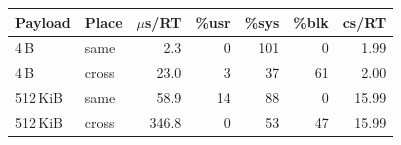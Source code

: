 \begin{tabular}{llrrrrr}
\toprule
Payload & Place & $\mu$s/RT & \%usr & \%sys & \%blk & cs/RT \\
\midrule
4\,B & same & 2.3 & 0 & 101 & 0 & 1.99 \\
4\,B & cross & 23.0 & 3 & 37 & 61 & 2.00 \\
512\,KiB & same & 58.9 & 14 & 88 & 0 & 15.99 \\
512\,KiB & cross & 346.8 & 0 & 53 & 47 & 15.99 \\
\bottomrule
\end{tabular}
